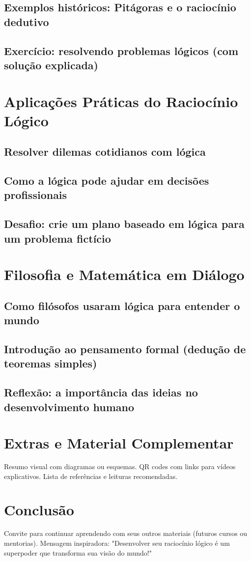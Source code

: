\documentclass[a4paper,12pt]{book}
\begin{document}
\section{Exemplos históricos: Pitágoras e o raciocínio dedutivo}
\lipsum[8]
\section{Exercício: resolvendo problemas lógicos (com solução explicada)}
\lipsum[9]

\chapter{Aplicações Práticas do Raciocínio Lógico}
\section{Resolver dilemas cotidianos com lógica}
\lipsum[10]
\section{Como a lógica pode ajudar em decisões profissionais}
\lipsum[11]
\section{Desafio: crie um plano baseado em lógica para um problema fictício}
\lipsum[12]

\chapter{Filosofia e Matemática em Diálogo}
\section{Como filósofos usaram lógica para entender o mundo}
\lipsum[13]
\section{Introdução ao pensamento formal (dedução de teoremas simples)}
\lipsum[14]
\section{Reflexão: a importância das ideias no desenvolvimento humano}
\lipsum[15]

\chapter*{Extras e Material Complementar}
Resumo visual com diagramas ou esquemas.\newline
QR codes com links para vídeos explicativos.\newline
Lista de referências e leituras recomendadas.

\chapter*{Conclusão}
Convite para continuar aprendendo com seus outros materiais (futuros cursos ou mentorias).\newline
Mensagem inspiradora: "Desenvolver seu raciocínio lógico é um superpoder que transforma sua visão do mundo!"
\end{document}
